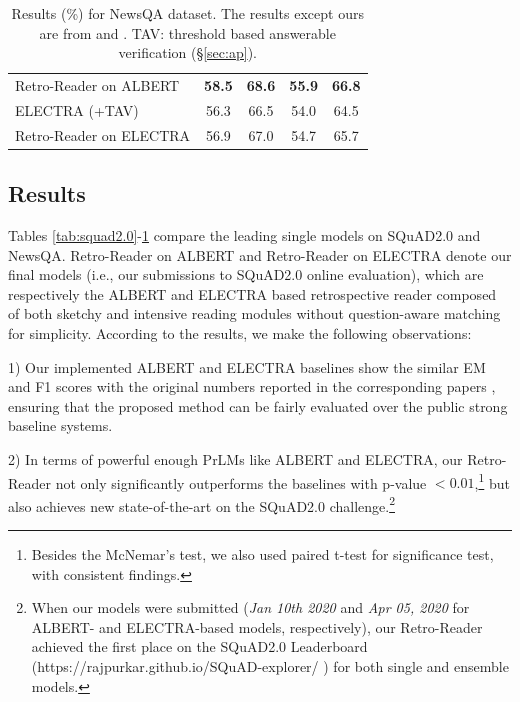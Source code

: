 \documentclass[letterpaper]{article} %
\begin{document}
\begin{table}
{\begin{tabular}{l c c c c }
			Retro-Reader on ALBERT  &  \textbf{58.5} & \textbf{68.6} & \textbf{55.9} &  \textbf{66.8} \\
			ELECTRA (+TAV)  & 56.3 & 66.5 & 54.0 & 64.5\\
			Retro-Reader on ELECTRA & 56.9 &  67.0 & 54.7& 65.7 \\
			\bottomrule
		\end{tabular}
	}
	\caption{Results (\%) for NewsQA dataset. The results except ours are from \citeauthor{tay2018densely}  and \citeauthor{back2020neurquri} . TAV: threshold based answerable verification (\S\ref{sec:ap}).}\label{tab:newsqa} 
\end{table}



\subsection{Results}
Tables \ref{tab:squad2.0}-\ref{tab:newsqa} compare the leading single models on SQuAD2.0 and NewsQA.
Retro-Reader on ALBERT and Retro-Reader on ELECTRA denote our final models (i.e., our submissions to SQuAD2.0 online evaluation), which are respectively the ALBERT and ELECTRA based retrospective reader composed of both sketchy and intensive reading modules without question-aware matching for simplicity. %
According to the results, we make the following observations:

1) Our implemented ALBERT and ELECTRA baselines show the similar EM and F1 scores with the original numbers reported in the corresponding papers \cite{Lan2020ALBERT,clark2019electra}, ensuring that the proposed method can be fairly evaluated over the public strong baseline systems.

2) In terms of powerful enough PrLMs like ALBERT and ELECTRA, our Retro-Reader not only significantly outperforms the baselines with p-value $<0.01$,\footnote{Besides the McNemar's test, we also used paired t-test for significance test, with consistent findings.} but also achieves new state-of-the-art on the SQuAD2.0 challenge.\footnote{When our models were submitted (\textit{Jan 10th 2020} and \textit{Apr 05, 2020} for ALBERT- and ELECTRA-based models, respectively), our Retro-Reader achieved the first place on the SQuAD2.0 Leaderboard (https://rajpurkar.github.io/SQuAD-explorer/ ) for both single and ensemble models.}
\end{document}
